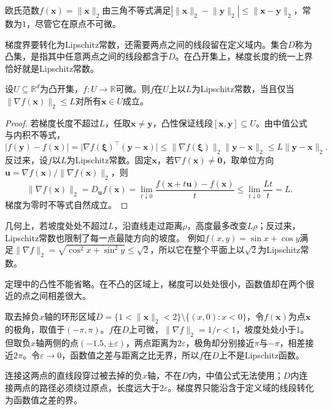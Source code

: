 欧氏范数$f(\bm x)=\lVert\bm x\rVert_2$由三角不等式满足$|\lVert\bm x\rVert_2-\lVert\bm y\rVert_2|\leq\lVert\bm x-\bm y\rVert_2$，常数为$1$，尽管它在原点不可微。

梯度界要转化为Lipschitz常数，还需要两点之间的线段留在定义域内。集合$D$称为凸集，是指其中任意两点之间的线段都含于$D$。在凸开集上，梯度长度的统一上界恰好就是Lipschitz常数。
\begin{theorem}[梯度有界与Lipschitz条件]
\label{thm:multivariable-gradient-lipschitz}
设$U\subseteq\mathbb R^d$为凸开集，$f:U\to\mathbb R$可微。则$f$在$U$上以$L$为Lipschitz常数，当且仅当$\lVert\nabla f(\bm x)\rVert_2\leq L$对所有$\bm x\in U$成立。
\end{theorem}
\begin{proof}
若梯度长度不超过$L$，任取$\bm x\neq\bm y$，凸性保证线段$[\bm x,\bm y]\subseteq U$。由中值公式与内积不等式，
\[
 |f(\bm y)-f(\bm x)|=\bigl|\nabla f(\bm\xi)^\top(\bm y-\bm x)\bigr|\leq\lVert\nabla f(\bm\xi)\rVert_2\lVert\bm y-\bm x\rVert_2\leq L\lVert\bm y-\bm x\rVert_2.
\]
反过来，设$f$以$L$为Lipschitz常数。固定$\bm x$，若$\nabla f(\bm x)\neq\bm0$，取单位方向$\bm u=\nabla f(\bm x)/\lVert\nabla f(\bm x)\rVert_2$，则
\[
 \lVert\nabla f(\bm x)\rVert_2=D_{\bm u}f(\bm x)=\lim_{t\downarrow0}\frac{f(\bm x+t\bm u)-f(\bm x)}t\leq\lim_{t\downarrow0}\frac{Lt}t=L.
\]
梯度为零时不等式自然成立。
\end{proof}
几何上，若坡度处处不超过$L$，沿直线走过距离$\rho$，高度最多改变$L\rho$；反过来，Lipschitz常数也限制了每一点最陡方向的坡度。
例如$f(x,y)=\sin x+\cos y$满足$\lVert\nabla f\rVert_2=\sqrt{\cos^2x+\sin^2y}\leq\sqrt2$，所以它在整个平面上以$\sqrt2$为Lipschitz常数。

定理中的凸性不能省略。在不凸的区域上，梯度可以处处很小，函数值却在两个很近的点之间相差很大。
\begin{example}[非凸区域上梯度有界而不Lipschitz]
\label{ex:multivariable-nonconvex-lipschitz-failure}
取去掉负$x$轴的环形区域$D=\{1<\lVert\bm x\rVert_2<2\}\setminus\{(x,0):x<0\}$，令$f(\bm x)$为点$\bm x$的极角，取值于$(-\pi,\pi)$。$f$在$D$上可微，$\lVert\nabla f\rVert_2=1/r<1$，坡度处处小于$1$。
但取负$x$轴两侧的点$(-1.5,\pm\varepsilon)$，两点距离为$2\varepsilon$，极角却分别接近$\pi$与$-\pi$，相差接近$2\pi$。令$\varepsilon\to0$，函数值之差与距离之比无界，所以$f$在$D$上不是Lipschitz函数。
\end{example}

连接这两点的直线段穿过被去掉的负$x$轴，不在$D$内，中值公式无法使用；$D$内连接两点的路径必须绕过原点，长度远大于$2\varepsilon$。梯度界只能沿含于定义域的线段转化为函数值之差的界。

